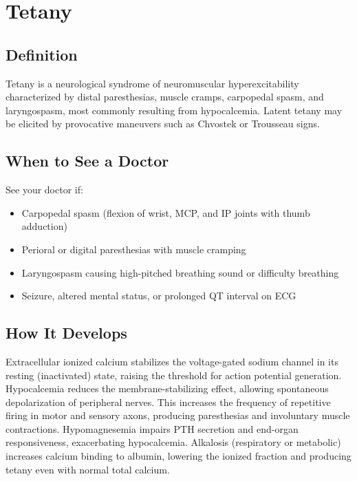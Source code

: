 \chapter{Tetany}

\section*{Definition}
Tetany is a neurological syndrome of neuromuscular hyperexcitability characterized by distal paresthesias, muscle cramps, carpopedal spasm, and laryngospasm, most commonly resulting from hypocalcemia. Latent tetany may be elicited by provocative maneuvers such as Chvostek or Trousseau signs.

\section*{When to See a Doctor}
See your doctor if:
\begin{itemize}
  \item Carpopedal spasm (flexion of wrist, MCP, and IP joints with thumb adduction)
  \item Perioral or digital paresthesias with muscle cramping
  \item Laryngospasm causing high-pitched breathing sound or difficulty breathing
  \item Seizure, altered mental status, or prolonged QT interval on ECG
\end{itemize}

\section*{How It Develops}
Extracellular ionized calcium stabilizes the voltage-gated sodium channel in its resting (inactivated) state, raising the threshold for action potential generation. Hypocalcemia reduces the membrane-stabilizing effect, allowing spontaneous depolarization of peripheral nerves. This increases the frequency of repetitive firing in motor and sensory axons, producing paresthesias and involuntary muscle contractions. Hypomagnesemia impairs PTH secretion and end-organ responsiveness, exacerbating hypocalcemia. Alkalosis (respiratory or metabolic) increases calcium binding to albumin, lowering the ionized fraction and producing tetany even with normal total calcium.

